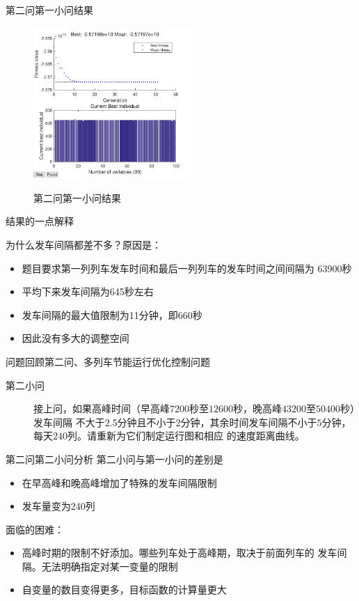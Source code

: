 \documentclass{beamer}
\begin{document}
\begin{frame}{第二问第一小问结果}
\begin{figure}
  \centering
  \includegraphics[width=6cm]{fig/fig13/fig13.pdf}\\
  \caption{第二问第一小问结果}
\end{figure}

\end{frame}

\begin{frame}{结果的一点解释}

为什么发车间隔都差不多？原因是：
\begin{itemize}
    \item<1-> 题目要求第一列列车发车时间和最后一列列车的发车时间之间间隔为
        63900秒
    \item<2-> 平均下来发车间隔为645秒左右
    \item<3-> 发车间隔的最大值限制为11分钟，即660秒
    \item<4-> 因此没有多大的调整空间
\end{itemize}

\end{frame}

\begin{frame}{问题回顾}{第二问、多列车节能运行优化控制问题}
\begin{description}
  \item[第二小问] 接上问，如果高峰时间（早高峰$7200$秒至$12600$秒，晚高峰$43200$至$50400$秒）发车间隔
  不大于$2.5$分钟且不小于$2$分钟，其余时间发车间隔不小于$5$分钟，每天$240$列。请重新为它们制定运行图和相应
  的速度距离曲线。
\end{description}
\end{frame}

\begin{frame}{第二问第二小问分析}
第二小问与第一小问的差别是
\begin{itemize}
    \item<1-> 在早高峰和晚高峰增加了特殊的发车间隔限制
    \item<2-> 发车量变为240列
\end{itemize}
面临的困难：
\begin{itemize}
    \item<3-> 高峰时期的限制不好添加。哪些列车处于高峰期，取决于前面列车的
        发车间隔。无法明确指定对某一变量的限制
    \item<4-> 自变量的数目变得更多，目标函数的计算量更大
\end{itemize}
\end{frame}
\end{document}
